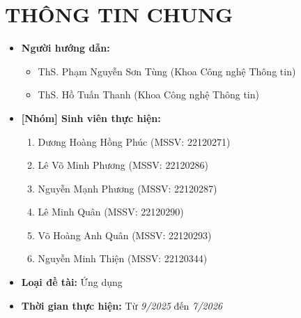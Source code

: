 \documentclass{article}[14pt]
\begin{document}
    \section{THÔNG TIN CHUNG}
    \begin{itemize}[label = {}]
        
        \item \textbf{Người hướng dẫn:} 
        \begin{itemize}
            \item ThS. Phạm Nguyễn Sơn Tùng (Khoa Công nghệ Thông tin)
            \item ThS. Hồ Tuấn Thanh (Khoa Công nghệ Thông tin)
        \end{itemize}{}
    
        
        \item \textbf{[Nhóm] Sinh viên thực hiện:}
        
        \begin{enumerate}
        
            \item Dương Hoàng Hồng Phúc (MSSV: 22120271)
            \item Lê Võ Minh Phương (MSSV: 22120286)
            \item Nguyễn Mạnh Phương (MSSV: 22120287)
            \item Lê Minh Quân (MSSV: 22120290)
            \item Võ Hoàng Anh Quân (MSSV: 22120293)
            \item Nguyễn Minh Thiện (MSSV: 22120344)
        \end{enumerate}

        \item \textbf{Loại đề tài:} Ứng dụng
        
        \item \textbf{Thời gian thực hiện:} Từ \textit{9/2025} đến \textit{7/2026}
        
        
    \end{itemize}
    
    \pagebreak 
    
\end{document}
